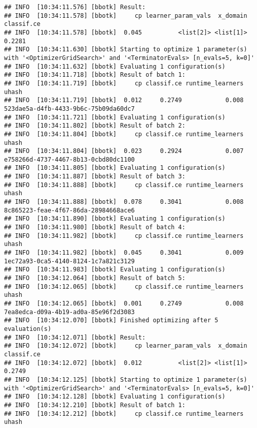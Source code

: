 \documentclass[
]{scrbook}
\begin{document}
\begin{verbatim}
## INFO  [10:34:11.576] [bbotk] Result: 
## INFO  [10:34:11.578] [bbotk]     cp learner_param_vals  x_domain classif.ce 
## INFO  [10:34:11.578] [bbotk]  0.045          <list[2]> <list[1]>     0.2281 
## INFO  [10:34:11.630] [bbotk] Starting to optimize 1 parameter(s) with '<OptimizerGridSearch>' and '<TerminatorEvals> [n_evals=5, k=0]' 
## INFO  [10:34:11.632] [bbotk] Evaluating 1 configuration(s) 
## INFO  [10:34:11.718] [bbotk] Result of batch 1: 
## INFO  [10:34:11.719] [bbotk]     cp classif.ce runtime_learners                                uhash 
## INFO  [10:34:11.719] [bbotk]  0.012     0.2749            0.008 523dae5a-d4fb-4433-9b6c-75b09da60dc7 
## INFO  [10:34:11.721] [bbotk] Evaluating 1 configuration(s) 
## INFO  [10:34:11.802] [bbotk] Result of batch 2: 
## INFO  [10:34:11.804] [bbotk]     cp classif.ce runtime_learners                                uhash 
## INFO  [10:34:11.804] [bbotk]  0.023     0.2924            0.007 e758266d-4737-4467-8b13-0cbd80dc1100 
## INFO  [10:34:11.805] [bbotk] Evaluating 1 configuration(s) 
## INFO  [10:34:11.887] [bbotk] Result of batch 3: 
## INFO  [10:34:11.888] [bbotk]     cp classif.ce runtime_learners                                uhash 
## INFO  [10:34:11.888] [bbotk]  0.078     0.3041            0.008 8c865223-feae-4f67-86da-28984668ace6 
## INFO  [10:34:11.890] [bbotk] Evaluating 1 configuration(s) 
## INFO  [10:34:11.980] [bbotk] Result of batch 4: 
## INFO  [10:34:11.982] [bbotk]     cp classif.ce runtime_learners                                uhash 
## INFO  [10:34:11.982] [bbotk]  0.045     0.3041            0.009 1ec72a93-0ca5-4140-8124-1c7a821c3129 
## INFO  [10:34:11.983] [bbotk] Evaluating 1 configuration(s) 
## INFO  [10:34:12.064] [bbotk] Result of batch 5: 
## INFO  [10:34:12.065] [bbotk]     cp classif.ce runtime_learners                                uhash 
## INFO  [10:34:12.065] [bbotk]  0.001     0.2749            0.008 7ea8edca-d09a-4b19-ad0a-85e96f2d3083 
## INFO  [10:34:12.070] [bbotk] Finished optimizing after 5 evaluation(s) 
## INFO  [10:34:12.071] [bbotk] Result: 
## INFO  [10:34:12.072] [bbotk]     cp learner_param_vals  x_domain classif.ce 
## INFO  [10:34:12.072] [bbotk]  0.012          <list[2]> <list[1]>     0.2749 
## INFO  [10:34:12.125] [bbotk] Starting to optimize 1 parameter(s) with '<OptimizerGridSearch>' and '<TerminatorEvals> [n_evals=5, k=0]' 
## INFO  [10:34:12.128] [bbotk] Evaluating 1 configuration(s) 
## INFO  [10:34:12.210] [bbotk] Result of batch 1: 
## INFO  [10:34:12.212] [bbotk]     cp classif.ce runtime_learners                                uhash 

\end{verbatim}
\end{document}
